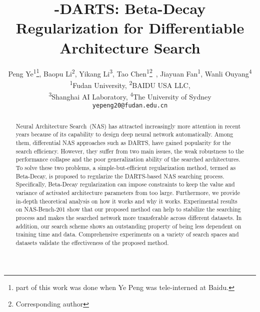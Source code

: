 \documentclass[10pt,twocolumn,letterpaper]{article}
\begin{document}
\title{-DARTS: Beta-Decay Regularization for Differentiable Architecture Search}

\author{Peng Ye\textsuperscript{1}\thanks{part of this work was done when Ye Peng was tele-interned at Baidu.}, Baopu Li\textsuperscript{2}, Yikang Li\textsuperscript{3}, Tao Chen\textsuperscript{1}\thanks{ Corresponding author}~, Jiayuan Fan\textsuperscript{1}, Wanli Ouyang\textsuperscript{4}\\
\textsuperscript{1}Fudan University, \textsuperscript{2}BAIDU USA LLC,  \\
\textsuperscript{3}Shanghai AI Laboratory, \textsuperscript{4}The University of Sydney\\
{\tt\small yepeng20@fudan.edu.cn}
}


\maketitle
\begin{abstract}
Neural Architecture Search~(NAS) has attracted increasingly more attention in recent years because of its capability to design deep neural network automatically. 
Among them, differential NAS approaches such as DARTS, have gained popularity for the search efficiency. 
However, they suffer from two main issues, the weak robustness to the performance collapse and the poor generalization ability of the searched architectures. 
To solve these two problems, a simple-but-efficient regularization method, termed as Beta-Decay, is proposed to regularize the DARTS-based NAS searching process. Specifically, Beta-Decay regularization can impose constraints to keep the value and variance of activated architecture parameters from too large.
Furthermore, we provide in-depth theoretical analysis on how it works and why it works. 
Experimental results on NAS-Bench-201 show that our proposed method can help to stabilize the searching process and makes the searched network more transferable across different datasets. 
In addition, our search scheme shows an outstanding property of being less dependent on training time and data.
Comprehensive experiments on a variety of search spaces and datasets validate the effectiveness of the proposed method.
\end{abstract}
\end{document}
